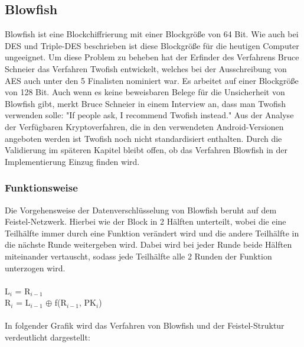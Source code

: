 \documentclass[10pt, a4paper,headsepline]{scrreprt}
\begin{document}
\subsection{Blowfish}
Blowfish ist eine Blockchiffrierung mit einer Blockgröße von 64 Bit. Wie auch bei DES und Triple-DES beschrieben ist diese Blockgröße für die heutigen Computer ungeeignet. Um diese Problem zu beheben hat der Erfinder des Verfahrens Bruce Schneier das Verfahren Twofish entwickelt, welches bei der Ausschreibung von AES auch unter den 5 Finalisten nominiert war. Es arbeitet auf einer Blockgröße von 128 Bit. Auch wenn es keine beweisbaren Belege für die Unsicherheit von Blowfish gibt, merkt Bruce Schneier in einem Interview an, dass man Twofish verwenden solle: "If people ask, I recommend Twofish instead." \cite{website:compworld-schneier}
Aus der Analyse der Verfügbaren Kryptoverfahren, die in den verwendeten Android-Versionen angeboten werden ist Twofish noch nicht standardisiert enthalten. Durch die Validierung im späteren Kapitel bleibt offen, ob das Verfahren Blowfish in der Implementierung Einzug finden wird.

\subsubsection{Funktionsweise}
Die Vorgehensweise der Datenverschlüsselung von Blowfish beruht auf dem Feistel-Netzwerk. Hierbei wie der Block in 2 Hälften unterteilt, wobei die eine Teilhälfte immer durch eine Funktion verändert wird und die andere Teilhälfte in die nächste Runde weitergeben wird. Dabei wird bei jeder Runde beide Hälften miteinander vertauscht, sodass jede Teilhälfte alle 2 Runden der Funktion unterzogen wird. \\ \\
L$_{i}$ = R$_{i-1}$ \\
R$_{i}$ = L$_{i-1}$ $\oplus$ f(R$_{i-1}$, PK$_{i}$) \\ \\
In folgender Grafik wird das Verfahren von Blowfish und der Feistel-Struktur verdeutlicht dargestellt: 
\end{document}
